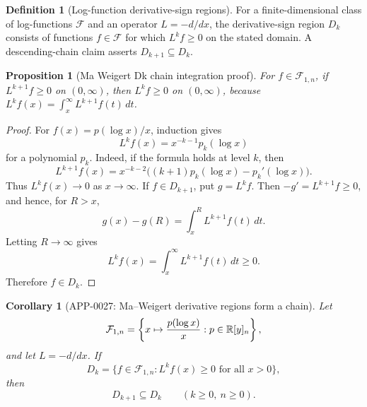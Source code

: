 \documentclass[11pt]{article}
\numberwithin{equation}{section}
\newtheorem{proposition}[theorem]{Proposition}
\newtheorem{corollary}[theorem]{Corollary}
\theoremstyle{definition}
\newtheorem{definition}{Definition}[section]
\theoremstyle{remark}
\newcommand{\1}{\mathbf 1}
\begin{document}
\begin{definition}[Log-function derivative-sign regions]
\label{res:log-function-derivative-chain-language}
For a finite-dimensional class of log-functions \(\mathcal F\) and an operator \(L=-d/dx\), the derivative-sign region \(D_k\) consists of functions \(f\in\mathcal F\) for which \(L^k f\ge0\) on the stated domain. A descending-chain claim asserts \(D_{k+1}\subseteq D_k\).
\end{definition}

\begin{proposition}[Ma Weigert Dk chain integration proof]
\label{res:ma-weigert-dk-chain-integration-proof}
For \(f\in\mathcal F_{1,n}\), if \(L^{k+1}f\ge0\) on \((0,\infty)\), then \(L^k f\ge0\) on \((0,\infty)\), because \(L^k f(x)=\int_x^\infty L^{k+1}f(t)\,dt\).
\end{proposition}

\begin{proof}
For \(f(x)=p(\log x)/x\), induction gives
\[
 L^k f(x)=x^{-k-1}p_k(\log x)
\]
for a polynomial \(p_k\).  Indeed, if the formula holds at level \(k\), then
\[
 L^{k+1}f(x)
 =x^{-k-2}\bigl((k+1)p_k(\log x)-p_k'(\log x)\bigr).
\]
Thus \(L^k f(x)\to0\) as \(x\to\infty\).  If \(f\in D_{k+1}\), put
\(g=L^k f\).  Then \(-g'=L^{k+1}f\ge0\), and hence, for \(R>x\),
\[
 g(x)-g(R)=\int_x^R L^{k+1}f(t)\,dt .
\]
Letting \(R\to\infty\) gives
\[
 L^k f(x)=\int_x^\infty L^{k+1}f(t)\,dt\ge0.
\]
Therefore \(f\in D_k\).
\end{proof}

\begin{corollary}[APP-0027: Ma--Weigert derivative regions form a chain]
\label{thm:app27-ma-weigert-chain}
Let
\[
 \mathcal F_{1,n}
 =
 \left\{x\mapsto {p(\log x)\over x}:p\in\mathbb R[y]_n\right\},
\]
and let \(L=-d/dx\).  If
\[
 D_k=\{f\in\mathcal F_{1,n}:L^kf(x)\ge0\text{ for all }x>0\},
\]
then
\[
 D_{k+1}\subseteq D_k
 \qquad(k\ge0,\ n\ge0).
\]


\end{corollary}
\end{document}
